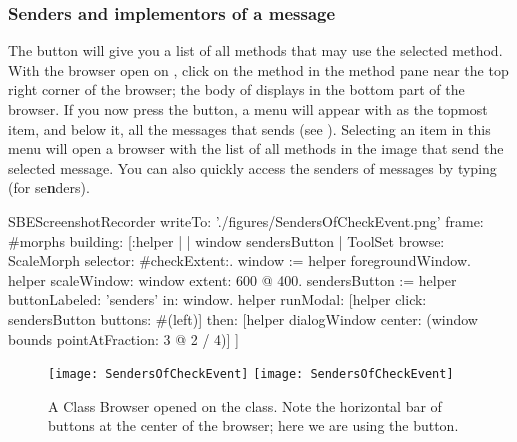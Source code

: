 \documentclass[a4paper,10pt,twoside]{book}
\begin{document}

\subsubsection{Senders and implementors of a message}
\label{sec:sendersImplementors}

The  button will give you a list of all methods that may use the selected method.
With the browser open on , click on the  method in the method pane near the top right corner of the browser; the body of  displays in the bottom part of the browser.
If you now press the  button, a menu will appear with  as the topmost item, and below it, all the messages that  sends (see ).
Selecting an item in this menu will open a browser with the list of all methods in the image that send the selected message.
You can also quickly access the senders of messages by typing  (for {se\textbf{n}ders}).

\begin{ExecuteSmalltalkScript}
SBEScreenshotRecorder writeTo: './figures/SendersOfCheckEvent.png' frame: #morphs building: [:helper |
	| window sendersButton |
	ToolSet browse: ScaleMorph selector: #checkExtent:.
	window := helper foregroundWindow.
	helper scaleWindow: window extent: 600 @ 400.
	sendersButton := helper buttonLabeled: 'senders' in: window.
	helper
		runModal: [helper click: sendersButton buttons: #(left)]
		then: [helper dialogWindow center: (window bounds pointAtFraction: 3 @ 2 / 4)]
]
\end{ExecuteSmalltalkScript}
\begin{figure}[htbp]
	\begin{center}
   \ifluluelse
		{\texttt{[image: SendersOfCheckEvent]}}
		{\texttt{[image: SendersOfCheckEvent]}}
	\end{center}
	\caption{A Class Browser opened on the  class. Note the horizontal bar of buttons at the center of the browser; here we are using the  button.}
	\label{fig:SendersOfCheckEvent}
\end{figure}
\end{document}
